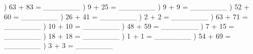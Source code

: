 \documentclass{article}%
\begin{document}
\newline%
) 63 + 83 = \_\_\_\_\_\_\_%
\newline%
\newline%
) 9 + 25 = \_\_\_\_\_\_\_%
\newline%
\newline%
) 9 + 9 = \_\_\_\_\_\_\_%
\newline%
\newline%
) 52 + 60 = \_\_\_\_\_\_\_%
\newline%
\newline%
) 26 + 41 = \_\_\_\_\_\_\_%
\newline%
\newline%
) 2 + 2 = \_\_\_\_\_\_\_%
\newline%
\newline%
) 63 + 71 = \_\_\_\_\_\_\_%
\newline%
\newline%
) 10 + 10 = \_\_\_\_\_\_\_%
\newline%
\newline%
) 48 + 59 = \_\_\_\_\_\_\_%
\newline%
\newline%
) 7 + 15 = \_\_\_\_\_\_\_%
\newline%
\newline%
) 18 + 18 = \_\_\_\_\_\_\_%
\newline%
\newline%
) 1 + 1 = \_\_\_\_\_\_\_%
\newline%
\newline%
) 54 + 69 = \_\_\_\_\_\_\_%
\newline%
\newline%
) 3 + 3 = \_\_\_\_\_\_\_%
\newline%
\newline%
\newline%
\end{document}
